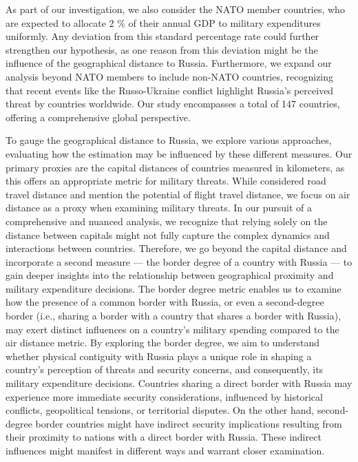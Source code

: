 \documentclass[12pt,a4paper]{article}
\begin{document}
As part of our investigation, we also consider the NATO member countries, who are expected to allocate 2 \% of their annual GDP to military expenditures uniformly. Any deviation from this standard percentage rate could further strengthen our hypothesis, as one reason from this deviation might be the influence of the geographical distance to Russia. Furthermore, we expand our analysis beyond NATO members to include non-NATO countries, recognizing that recent events like the Russo-Ukraine conflict highlight Russia's perceived threat by countries worldwide. Our study encompasses a total of 147 countries, offering a comprehensive global perspective.

To gauge the geographical distance to Russia, we explore various approaches, evaluating how the estimation may be influenced by these different measures. Our primary proxies are the capital distances of countries measured in kilometers, as this offers an appropriate metric for military threats. While \citet{kofrovn2023} considered road travel distance and mention the potential of flight travel distance, we focus on air distance as a proxy when examining military threats. In our pursuit of a comprehensive and nuanced analysis, we recognize that relying solely on the distance between capitals might not fully capture the complex dynamics and interactions between countries. Therefore, we go beyond the capital distance and incorporate a second measure — the border degree of a country with Russia — to gain deeper insights into the relationship between geographical proximity and military expenditure decisions. The border degree metric enables us to examine how the presence of a common border with Russia, or even a second-degree border (i.e., sharing a border with a country that shares a border with Russia), may exert distinct influences on a country's military spending compared to the air distance metric. By exploring the border degree, we aim to understand whether physical contiguity with Russia plays a unique role in shaping a country's perception of threats and security concerns, and consequently, its military expenditure decisions. Countries sharing a direct border with Russia may experience more immediate security considerations, influenced by historical conflicts, geopolitical tensions, or territorial disputes. On the other hand, second-degree border countries might have indirect security implications resulting from their proximity to nations with a direct border with Russia. These indirect influences might manifest in different ways and warrant closer examination.
\end{document}
